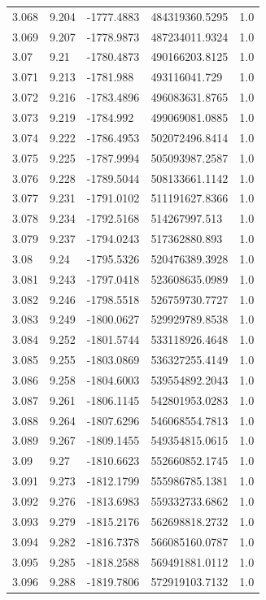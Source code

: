 \begin{tabular}{lllll}
3.068 & 9.204 & -1777.4883 & 484319360.5295 & 1.0 \\
3.069 & 9.207 & -1778.9873 & 487234011.9324 & 1.0 \\
3.07 & 9.21 & -1780.4873 & 490166203.8125 & 1.0 \\
3.071 & 9.213 & -1781.988 & 493116041.729 & 1.0 \\
3.072 & 9.216 & -1783.4896 & 496083631.8765 & 1.0 \\
3.073 & 9.219 & -1784.992 & 499069081.0885 & 1.0 \\
3.074 & 9.222 & -1786.4953 & 502072496.8414 & 1.0 \\
3.075 & 9.225 & -1787.9994 & 505093987.2587 & 1.0 \\
3.076 & 9.228 & -1789.5044 & 508133661.1142 & 1.0 \\
3.077 & 9.231 & -1791.0102 & 511191627.8366 & 1.0 \\
3.078 & 9.234 & -1792.5168 & 514267997.513 & 1.0 \\
3.079 & 9.237 & -1794.0243 & 517362880.893 & 1.0 \\
3.08 & 9.24 & -1795.5326 & 520476389.3928 & 1.0 \\
3.081 & 9.243 & -1797.0418 & 523608635.0989 & 1.0 \\
3.082 & 9.246 & -1798.5518 & 526759730.7727 & 1.0 \\
3.083 & 9.249 & -1800.0627 & 529929789.8538 & 1.0 \\
3.084 & 9.252 & -1801.5744 & 533118926.4648 & 1.0 \\
3.085 & 9.255 & -1803.0869 & 536327255.4149 & 1.0 \\
3.086 & 9.258 & -1804.6003 & 539554892.2043 & 1.0 \\
3.087 & 9.261 & -1806.1145 & 542801953.0283 & 1.0 \\
3.088 & 9.264 & -1807.6296 & 546068554.7813 & 1.0 \\
3.089 & 9.267 & -1809.1455 & 549354815.0615 & 1.0 \\
3.09 & 9.27 & -1810.6623 & 552660852.1745 & 1.0 \\
3.091 & 9.273 & -1812.1799 & 555986785.1381 & 1.0 \\
3.092 & 9.276 & -1813.6983 & 559332733.6862 & 1.0 \\
3.093 & 9.279 & -1815.2176 & 562698818.2732 & 1.0 \\
3.094 & 9.282 & -1816.7378 & 566085160.0787 & 1.0 \\
3.095 & 9.285 & -1818.2588 & 569491881.0112 & 1.0 \\
3.096 & 9.288 & -1819.7806 & 572919103.7132 & 1.0 \\

\end{tabular}
